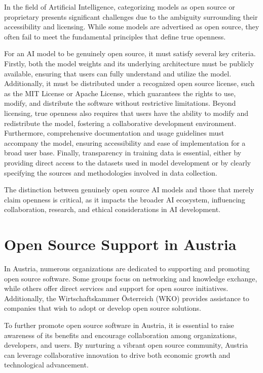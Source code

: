 In the field of Artificial Intelligence, categorizing models as open source or proprietary presents significant challenges due to the ambiguity surrounding their accessibility and licensing. While some models are advertised as open source, they often fail to meet the fundamental principles that define true openness.  

For an AI model to be genuinely open source, it must satisfy several key criteria. Firstly, both the model weights and its underlying architecture must be publicly available, ensuring that users can fully understand and utilize the model. Additionally, it must be distributed under a recognized open source license, such as the MIT License or Apache License, which guarantees the rights to use, modify, and distribute the software without restrictive limitations. Beyond licensing, true openness also requires that users have the ability to modify and redistribute the model, fostering a collaborative development environment. Furthermore, comprehensive documentation and usage guidelines must accompany the model, ensuring accessibility and ease of implementation for a broad user base. Finally, transparency in training data is essential, either by providing direct access to the datasets used in model development or by clearly specifying the sources and methodologies involved in data collection.  

The distinction between genuinely open source AI models and those that merely claim openness is critical, as it impacts the broader AI ecosystem, influencing collaboration, research, and ethical considerations in AI development.


\section{Open Source Support in Austria}

In Austria, numerous organizations are dedicated to supporting and promoting open source software. 
Some groups focus on networking and knowledge exchange, while others offer direct services and support for open source initiatives. 
Additionally, the Wirtschaftskammer Österreich (WKO) provides assistance to companies that wish to adopt or develop open source solutions.

To further promote open source software in Austria, 
it is essential to raise awareness of its benefits and encourage collaboration among organizations, developers, and users. 
By nurturing a vibrant open source community, Austria can leverage collaborative innovation to drive both economic growth and technological advancement.

